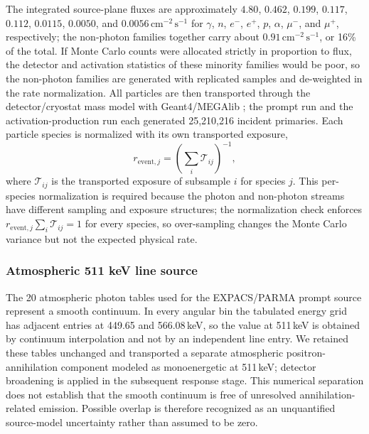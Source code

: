 \documentclass[11pt]{article}
\begin{document}
The integrated source-plane fluxes are approximately $4.80$, $0.462$, $0.199$,
$0.117$, $0.112$, $0.0115$, $0.0050$, and $0.0056\,\mathrm{cm^{-2}\,s^{-1}}$
for $\gamma$, $n$, $e^-$, $e^+$, $p$, $\alpha$, $\mu^-$, and $\mu^+$,
respectively; the non-photon families together carry about
$0.91\,\mathrm{cm^{-2}\,s^{-1}}$, or 16\% of the total. If Monte Carlo counts
were allocated strictly in proportion to flux, the detector and activation
statistics of these minority families would be poor, so the non-photon
families are generated with replicated samples and de-weighted in the rate
normalization. All particles are then transported through the
detector/cryostat mass model with Geant4/MEGAlib
\cite{Agostinelli2003,Allison2016,Zoglauer2006}; the prompt run and the
activation-production run each generated 25,210,216 incident primaries. Each
particle species is normalized with its own transported exposure,
\begin{equation}
  r_{\mathrm{event},j}=\left(\sum_i \mathcal{T}_{ij}\right)^{-1},
\end{equation}
where $\mathcal{T}_{ij}$ is the transported exposure of subsample $i$ for
species $j$. This per-species normalization is required because the photon and
non-photon streams have different sampling and exposure structures; the
normalization check enforces $r_{\mathrm{event},j}\sum_i\mathcal{T}_{ij}=1$
for every species, so over-sampling changes the Monte Carlo variance but not
the expected physical rate.

\subsubsection{Atmospheric 511 keV line source}
\label{subsec:atm511_source}

The 20 atmospheric photon tables used for the EXPACS/PARMA prompt source represent
a smooth continuum. In every angular bin the tabulated energy grid has adjacent
entries at 449.65 and 566.08\,keV, so the value at 511\,keV is obtained by
continuum interpolation and not by an independent line entry. We retained these
tables unchanged and transported a separate atmospheric positron-annihilation
component modeled as monoenergetic at 511\,keV; detector broadening is applied in
the subsequent response stage. This numerical
separation does not establish that the smooth continuum is free of unresolved
annihilation-related emission. Possible overlap is therefore recognized as an
unquantified source-model uncertainty rather than assumed to be zero.
\end{document}
